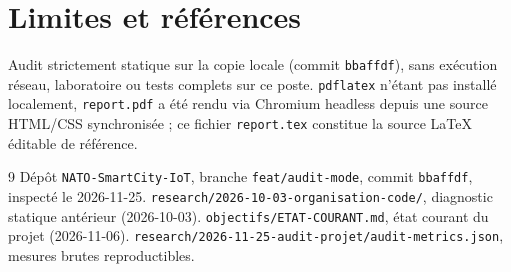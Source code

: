 \documentclass[11pt,a4paper]{article}
\begin{document}
\section{Limites et références}
Audit strictement statique sur la copie locale (commit \texttt{bbaffdf}), sans exécution réseau, laboratoire ou tests complets sur ce poste. \texttt{pdflatex} n'étant pas installé localement, \texttt{report.pdf} a été rendu via Chromium headless depuis une source HTML/CSS synchronisée ; ce fichier \texttt{report.tex} constitue la source LaTeX éditable de référence.

\begin{thebibliography}{9}
 Dépôt \texttt{NATO-SmartCity-IoT}, branche \texttt{feat/audit-mode}, commit \texttt{bbaffdf}, inspecté le 2026-11-25.
 \texttt{research/2026-10-03-organisation-code/}, diagnostic statique antérieur (2026-10-03).
 \texttt{objectifs/ETAT-COURANT.md}, état courant du projet (2026-11-06).
 \texttt{research/2026-11-25-audit-projet/audit-metrics.json}, mesures brutes reproductibles.
\end{thebibliography}
\end{document}

